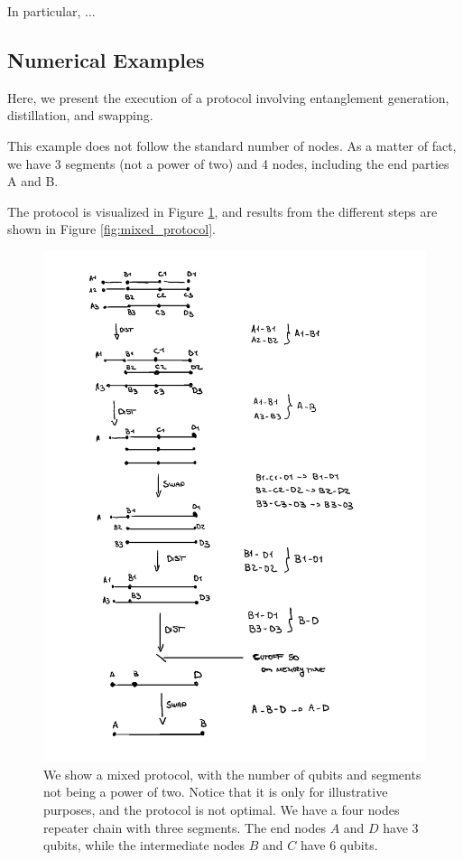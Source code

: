 \documentclass{masterthesis}
\begin{document}
In particular, ... %


\subsection*{Numerical Examples}

Here, we present the execution of a protocol involving entanglement generation, distillation, and swapping.

This example does not follow the standard number of nodes. As a matter of fact, we have 3 segments (not a power of two) and 4 nodes, including the end parties A and B.

The protocol is visualized in Figure \ref{fig:mixed_protocol_sketch}, and results from the different steps are shown in Figure \ref{fig:mixed_protocol}.

\begin{figure}[ht]
    \centering
    \includegraphics[width=0.8\linewidth]{images/dist_example_sketch.png}
    \caption{We show a mixed protocol, with the number of qubits and segments not being a power of two. Notice that it is only for illustrative purposes, and the protocol is not optimal. We have a four nodes repeater chain with three segments. The end nodes $A$ and $D$ have 3 qubits, while the intermediate nodes $B$ and $C$ have 6 qubits.}
    \label{fig:mixed_protocol_sketch} 
\end{figure}
\end{document}
